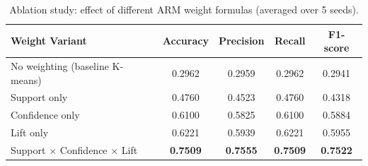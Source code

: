 \documentclass[11pt, a4paper]{article}
\begin{document}
\begin{table}[H]
    \centering
    \begin{tabular}{@{}lcccc@{}}
        \toprule
        \textbf{Weight Variant} & \textbf{Accuracy} & \textbf{Precision} & \textbf{Recall} & \textbf{F1-score} \\ \midrule
        No weighting (baseline K-means)          & 0.2962 & 0.2959 & 0.2962 & 0.2941 \\
        Support only                              & 0.4760 & 0.4523 & 0.4760 & 0.4318 \\
        Confidence only                           & 0.6100 & 0.5825 & 0.6100 & 0.5884 \\
        Lift only                                 & 0.6221 & 0.5939 & 0.6221 & 0.5955 \\
        Support $\times$ Confidence $\times$ Lift & \textbf{0.7509} & \textbf{0.7555} & \textbf{0.7509} & \textbf{0.7522} \\ \bottomrule
    \end{tabular}
    \caption{Ablation study: effect of different ARM weight formulas (averaged over 5 seeds).}
\end{table}
\end{document}
